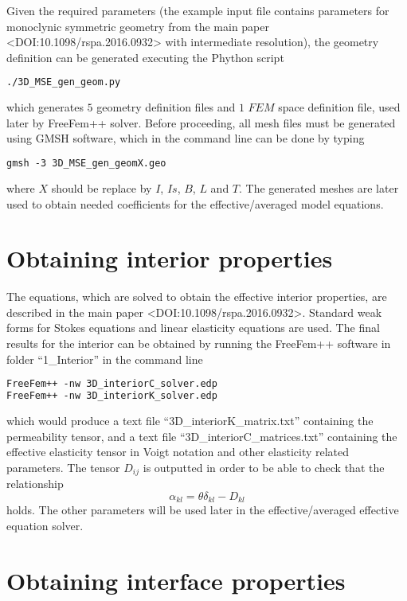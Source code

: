 \documentclass[12pt,a4paper]{article}
\begin{document}
Given the required parameters (the example input file contains parameters for monoclynic symmetric geometry from the main paper <DOI:10.1098/rspa.2016.0932> with intermediate resolution), the geometry definition can be generated executing the Phython script
\begin{lstlisting}[language=tex]
./3D_MSE_gen_geom.py
\end{lstlisting}
which generates $5$ geometry definition files and $1$ $FEM$ space definition file, used later by FreeFem++ solver. Before proceeding, all mesh files must be generated using GMSH software, which in the command line can be done by typing
\begin{lstlisting}[language=tex]
gmsh -3 3D_MSE_gen_geomX.geo
\end{lstlisting}
where $X$ should be replace by $I$, $Is$, $B$, $L$ and $T$. The generated meshes are later used to obtain needed coefficients for the effective/averaged model equations.

\section{Obtaining interior properties}

The equations, which are solved to obtain the effective interior properties, are described in the main paper <DOI:10.1098/rspa.2016.0932>. Standard weak forms for Stokes equations and linear elasticity equations are used. The final results for the interior can be obtained by running the FreeFem++ software in folder ``1\_Interior'' in the command line
\begin{lstlisting}[language=tex]
FreeFem++ -nw 3D_interiorC_solver.edp
FreeFem++ -nw 3D_interiorK_solver.edp
\end{lstlisting}
which would produce a text file ``3D\_interiorK\_matrix.txt'' containing the permeability tensor, and a text file ``3D\_interiorC\_matrices.txt'' containing the effective elasticity tensor in Voigt notation and other elasticity related parameters. The tensor $D_{ij}$ is outputted in order to be able to check that the relationship
\begin{equation}
\alpha_{kl} = \theta \delta_{kl} - D_{kl} \nonumber
\end{equation}
holds. The other parameters will be used later in the effective/averaged effective equation solver.

\section{Obtaining interface properties} \label{sec:presim-end}
\end{document}
